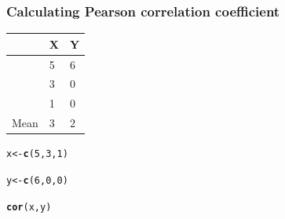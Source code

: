 \documentclass[dvipsnames]{beamer}\usepackage[]{graphicx}\usepackage[]{color}
\makeatletter
\newcommand{\hlnum}[1]{\textcolor[rgb]{0.686,0.059,0.569}{#1}}%
\newcommand{\hlstd}[1]{\textcolor[rgb]{0.345,0.345,0.345}{#1}}%
\newcommand{\hlkwb}[1]{\textcolor[rgb]{0.69,0.353,0.396}{#1}}%
\newcommand{\hlkwd}[1]{\textcolor[rgb]{0.737,0.353,0.396}{\textbf{#1}}}%
\newenvironment{kframe}{%
 \def\at@end@of@kframe{}%
 \ifinner\ifhmode%
  \def\at@end@of@kframe{\end{minipage}}%
  \begin{minipage}{\columnwidth}%
 \fi\fi%
 \def\FrameCommand##1{\hskip\@totalleftmargin \hskip-\fboxsep
 \colorbox{shadecolor}{##1}\hskip-\fboxsep
     \hskip-\linewidth \hskip-\@totalleftmargin \hskip\columnwidth}%
 \MakeFramed {\advance\hsize-\width
   \@totalleftmargin\z@ \linewidth\hsize
   \@setminipage}}%
 {\par\unskip\endMakeFramed%
 \at@end@of@kframe}
\newenvironment{knitrout}{}{} %
\makeatother
\begin{document}
\begin{frame}
\frametitle{Calculating Pearson correlation coefficient}
\begin{center}
\begin{tabular}{lll}
\hline
&X	& Y \\
\hline
&5 &	6 \\
&3	&0 \\
&1	&0 \\
\hline
Mean &	3	&2 \\
\hline
\end{tabular}
\end{center}
\begin{knitrout}
\color{fgcolor}\begin{kframe}
\begin{alltt}
\hlstd{x} \hlkwb{<-} \hlkwd{c}\hlstd{(}\hlnum{5}\hlstd{,} \hlnum{3}\hlstd{,} \hlnum{1}\hlstd{)}

\hlstd{y} \hlkwb{<-} \hlkwd{c}\hlstd{(}\hlnum{6}\hlstd{,} \hlnum{0}\hlstd{,} \hlnum{0}\hlstd{)}

\hlkwd{cor}\hlstd{(x, y)}
\end{alltt}
\end{kframe}
\end{knitrout}
\end{frame}

\end{document}
